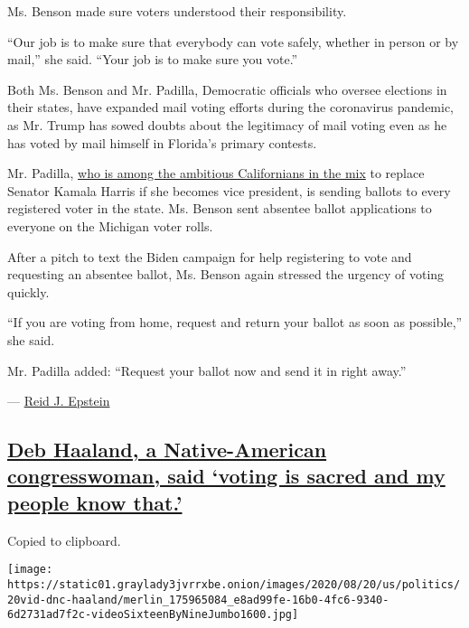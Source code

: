 Ms. Benson made sure voters understood their responsibility.

``Our job is to make sure that everybody can vote safely, whether in
person or by mail,'' she said. ``Your job is to make sure you vote.''

Both Ms. Benson and Mr. Padilla, Democratic officials who oversee
elections in their states, have expanded mail voting efforts during the
coronavirus pandemic, as Mr. Trump has sowed doubts about the legitimacy
of mail voting even as he has voted by mail himself in Florida's primary
contests.

Mr. Padilla,
\href{https://www.nytimes3xbfgragh.onion/2020/08/14/us/who-from-california-would-replace-kamala-harris-in-the-senate.html}{who
is among the ambitious Californians in the mix} to replace Senator
Kamala Harris if she becomes vice president, is sending ballots to every
registered voter in the state. Ms. Benson sent absentee ballot
applications to everyone on the Michigan voter rolls.

After a pitch to text the Biden campaign for help registering to vote
and requesting an absentee ballot, Ms. Benson again stressed the urgency
of voting quickly.

``If you are voting from home, request and return your ballot as soon as
possible,'' she said.

Mr. Padilla added: ``Request your ballot now and send it in right
away.''

--- \href{https://www.nytimes3xbfgragh.onion/by/reid-j-epstein}{Reid J.
Epstein}

\hypertarget{deb-haaland-a-native-american-congresswoman-said-voting-is-sacred-and-my-people-know-that}{%
\subsection{\texorpdfstring{\protect\hyperlink{deb-haaland-a-native-american-congresswoman-said-voting-is-sacred-and-my-people-know-that}{Deb
Haaland, a Native-American congresswoman, said `voting is sacred and my
people know
that.'}}{Deb Haaland, a Native-American congresswoman, said `voting is sacred and my people know that.'}}\label{deb-haaland-a-native-american-congresswoman-said-voting-is-sacred-and-my-people-know-that}}

Copied to clipboard.

\texttt{[image: https://static01.graylady3jvrrxbe.onion/images/2020/08/20/us/politics/20vid-dnc-haaland/merlin\_175965084\_e8ad99fe-16b0-4fc6-9340-6d2731ad7f2c-videoSixteenByNineJumbo1600.jpg]}

